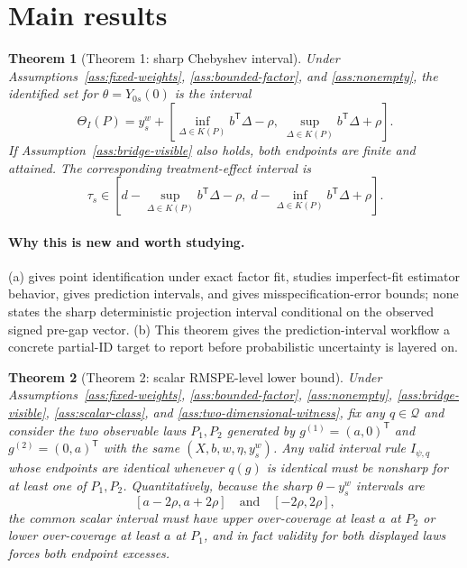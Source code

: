 \documentclass[11pt]{article}
\newcommand{\transpose}{\mathsf{T}}
\theoremstyle{definition}
\theoremstyle{plain}
\newtheorem{theorem}{Theorem}
\theoremstyle{remark}
\begin{document}
\section{Main results}
\begin{theorem}[Theorem 1: sharp Chebyshev interval]\label{thm:sharp-chebyshev}
Under Assumptions~\ref{ass:fixed-weights}, \ref{ass:bounded-factor}, and \ref{ass:nonempty}, the identified set for \(\theta=Y_{0s}(0)\) is the interval
\[
\Theta_I(P)=y_s^w+
\left[
\inf_{\Delta\in K(P)} b^\transpose\Delta-\rho,\;
\sup_{\Delta\in K(P)} b^\transpose\Delta+\rho
\right].
\]
If Assumption~\ref{ass:bridge-visible} also holds, both endpoints are finite and attained. The corresponding treatment-effect interval is
\[
\tau_s\in
\left[
d-\sup_{\Delta\in K(P)} b^\transpose\Delta-\rho,\;
d-\inf_{\Delta\in K(P)} b^\transpose\Delta+\rho
\right].
\]
\end{theorem}
\paragraph{Why this is new and worth studying.}
(a) \citet{AbadieDiamondHainmueller2010} gives point identification under exact factor fit, \citet{FermanPinto2021} studies imperfect-fit estimator behavior, \citet{CattaneoFengTitiunik2021} gives prediction intervals, and \citet{NazaretShiBlei2024} gives misspecification-error bounds; none states the sharp deterministic projection interval conditional on the observed signed pre-gap vector. (b) This theorem gives the \citet{CattaneoFengTitiunik2021} prediction-interval workflow a concrete partial-ID target to report before probabilistic uncertainty is layered on.

\begin{theorem}[Theorem 2: scalar RMSPE-level lower bound]\label{thm:scalar-lower-bound}
Under Assumptions~\ref{ass:fixed-weights}, \ref{ass:bounded-factor}, \ref{ass:nonempty}, \ref{ass:bridge-visible}, \ref{ass:scalar-class}, and \ref{ass:two-dimensional-witness}, fix any \(q\in\mathcal Q\) and consider the two observable laws \(P_1,P_2\) generated by \(g^{(1)}=(a,0)^\transpose\) and \(g^{(2)}=(0,a)^\transpose\) with the same \((X,b,w,\eta,y_s^w)\). Any valid interval rule \(I_{\psi,q}\) whose endpoints are identical whenever \(q(g)\) is identical must be nonsharp for at least one of \(P_1,P_2\). Quantitatively, because the sharp \(\theta-y_s^w\) intervals are
\[
[a-2\rho,a+2\rho]\quad\text{and}\quad[-2\rho,2\rho],
\]
the common scalar interval must have upper over-coverage at least \(a\) at \(P_2\) or lower over-coverage at least \(a\) at \(P_1\), and in fact validity for both displayed laws forces both endpoint excesses.
\end{theorem}
\end{document}
